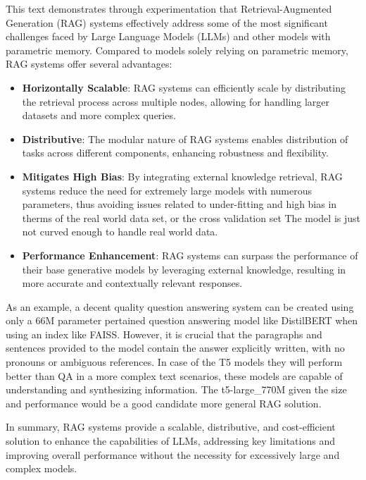 \documentclass{wseas}
\begin{document}
This text demonstrates through experimentation that Retrieval-Augmented
Generation (RAG) systems effectively address some of the most
significant challenges faced by Large Language Models (LLMs) and other
models with parametric memory. Compared to models solely relying on
parametric memory, RAG systems offer several advantages:

\begin{itemize}

\item
  \textbf{Horizontally Scalable}: RAG systems can efficiently scale by
  distributing the retrieval process across multiple nodes, allowing for
  handling larger datasets and more complex queries.
\item
  \textbf{Distributive}: The modular nature of RAG systems enables
  distribution of tasks across different components, enhancing
  robustness and flexibility.
\item
  \textbf{Mitigates High Bias}: By integrating external knowledge
  retrieval, RAG systems reduce the need for extremely large models with
  numerous parameters, thus avoiding issues related to under-fitting and
  high bias in therms of the real world data set, or the cross
  validation set The model is just not curved enough to handle real
  world data.
\item
  \textbf{Performance Enhancement}: RAG systems can surpass the
  performance of their base generative models by leveraging external
  knowledge, resulting in more accurate and contextually relevant
  responses.
\end{itemize}

As an example, a decent quality question answering system can be created
using only a 66M parameter pertained question answering model like
DistilBERT when using an index like FAISS. However, it is crucial that
the paragraphs and sentences provided to the model contain the answer
explicitly written, with no pronouns or ambiguous references. In case of
the T5 models they will perform better than QA in a more complex text
scenarios, these models are capable of understanding and synthesizing
information. The t5-large\_770M given the size and performance would be
a good candidate more general RAG solution.

In summary, RAG systems provide a scalable, distributive, and
cost-efficient solution to enhance the capabilities of LLMs, addressing
key limitations and improving overall performance without the necessity
for excessively large and complex models.
\end{document}

